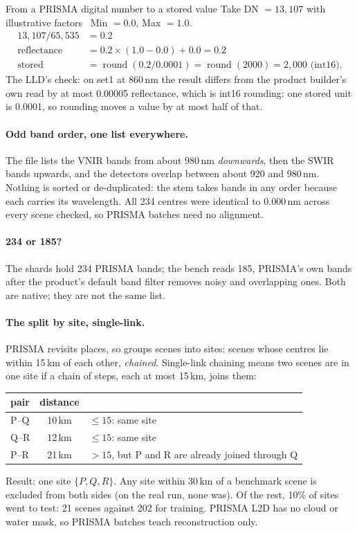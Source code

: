 \begin{worked}[label={we:pretrain:dn}]{From a PRISMA digital number to a stored value}
Take DN $= 13{,}107$ with illustrative factors \tagA\ Min $= 0.0$, Max $= 1.0$.
\begin{align*}
  13{,}107 / 65{,}535 &= 0.2\\
  \text{reflectance} &= 0.2 \times (1.0 - 0.0) + 0.0 = 0.2\\
  \text{stored} &= \operatorname{round}(0.2 / 0.0001) = \operatorname{round}(2000) = 2{,}000 \text{ (int16).}
\end{align*}
The LLD's check: on set1 at 860\,nm the result differs from the product builder's own read by at most 0.00005 reflectance, which
is int16 rounding: one stored unit is 0.0001, so rounding moves a value by at most half of that.
\end{worked}

\paragraph{Odd band order, one list everywhere.} The file lists the VNIR bands from about 980\,nm \emph{downwards}, then the SWIR
bands upwards, and the detectors overlap between about 920 and 980\,nm. Nothing is sorted or de-duplicated: the stem takes bands
in any order because each carries its wavelength. All 234 centres were identical to 0.000\,nm across every scene checked, so
PRISMA batches need no alignment.

\paragraph{234 or 185?} The shards hold 234 PRISMA bands; the bench reads 185, PRISMA's own bands after the product's default band
filter removes noisy and overlapping ones. Both are native; they are not the same list.

\paragraph{The split by site, single-link.} PRISMA revisits places, so  groups scenes into sites:
scenes whose centres lie within 15\,km of each other, \emph{chained}. Single-link chaining means two scenes are in one site if a
chain of steps, each at most 15\,km, joins them:
\begin{center}
\begin{tabular}{lcl}
\toprule
pair & distance & \\
\midrule
P--Q & 10\,km & $\le 15$: same site\\
Q--R & 12\,km & $\le 15$: same site\\
P--R & 21\,km & $> 15$, but P and R are already joined through Q\\
\bottomrule
\end{tabular}
\end{center}
Result: one site $\{P, Q, R\}$. Any site within 30\,km of a benchmark scene is excluded from both sides (on the real run, none
was). Of the rest, 10\% of sites went to test: 21 scenes against 202 for training. PRISMA L2D has no cloud or water mask, so PRISMA
batches teach reconstruction only.

